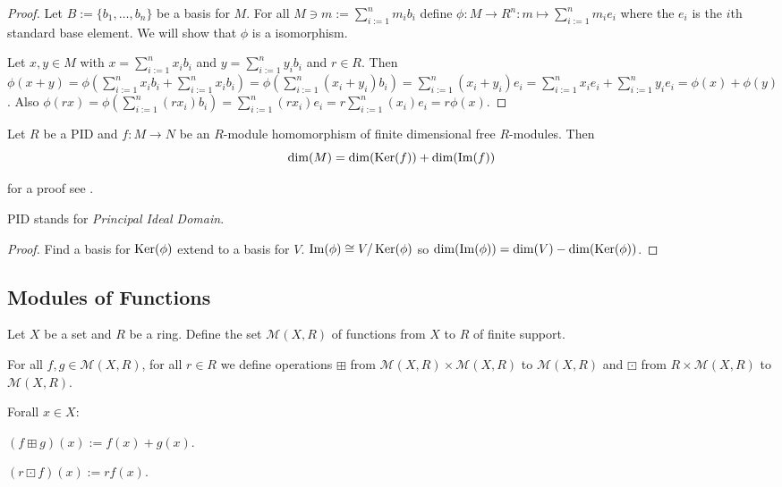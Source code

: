 \begin{proof}
	Let $B:=\{b_{1},\ldots,b_{n}\}$ be a basis for $M$. For all $M\ni m :=
	\sum_{i:=1}^{n}m_{i}b_{i}$ define $\phi: M \rightarrow R^{n} : m \mapsto
	\sum_{i:=1}^{n}m_{i}e_{i}$ where the $e_{i}$ is the $i$th standard base
	element. We will show that $\phi$ is a isomorphism.
	
	Let $x,y\in M$ with $x=\sum_{i:=1}^{n}x_{i}b_{i}$ and
	$y=\sum_{i:=1}^{n}y_{i}b_{i}$ and $r\in R$. Then $\phi(x+y) = \phi(
	\sum_{i:=1}^{n} x_{i}b_{i} + \sum_{i:=1}^{n} x_{i}b_{i} ) = \phi(
	\sum_{i:=1}^{n} (x_{i}+y_{i})b_{i} ) = \sum_{i:=1}^{n}(x_{i}+y_{i})e_{i}
	= \sum_{i:=1}^{n}x_{i}e_{i} + \sum_{i:=1}^{n}y_{i}e_{i} = \phi(x) +
	\phi(y)$. Also $\phi(rx) = \phi(\sum_{i:=1}^{n}(rx_{i})b_{i}) =
	\sum_{i:=1}^{n}(rx_{i})e_{i} = r\sum_{i:=1}^{n}(x_{i})e_{i} = r\phi(x)$.
\end{proof}

\begin{proposition}\label{proposition:ranknullity}
	Let $R$ be a PID and $f:M\rightarrow N$ be an $R$-module homomorphism of
	finite dimensional free $R$-modules. Then
	\[
		\dim(M) = \dim( \operatorname{Ker}( f ) ) + \dim( \operatorname{Im}( f ) )
	\]
\end{proposition}

for a proof see \cite{adkins92}.

\begin{remark}
	PID stands for \emph{Principal Ideal Domain}.
\end{remark}

\begin{proof}
	Find a basis for $\operatorname{Ker}(\phi)$ extend to a basis for $V$. $\operatorname{Im}(\phi)
	\cong V/\operatorname{Ker}(\phi)$ so $\dim(\operatorname{Im}(\phi)) = \dim(V) -
	\dim(\operatorname{Ker}(\phi))$.  
\end{proof}

\subsection{Modules of Functions}

\begin{definition}
	Let $X$ be a set and $R$ be a ring. Define the set $\mathcal{M}(X,R)$ of
	functions from $X$ to $R$ of finite support.
	
	For all $f,g\in\mathcal{M}(X,R)$, for all $r\in R$ we define operations
	$\boxplus$ from $\mathcal{M}(X,R)\times\mathcal{M}(X,R)$ to
	$\mathcal{M}(X,R)$ and $\boxdot$ from $R\times\mathcal{M}(X,R)$ to
	$\mathcal{M}(X,R)$. 
	
	Forall $x\in X$:
	\begin{definitionlist}[$\mathcal{M}$]
		\item $(f\boxplus g)(x) := f(x) + g(x)$.
		\item $(r\boxdot f)(x) := r f(x)$. 
	\end{definitionlist}
\end{definition}

